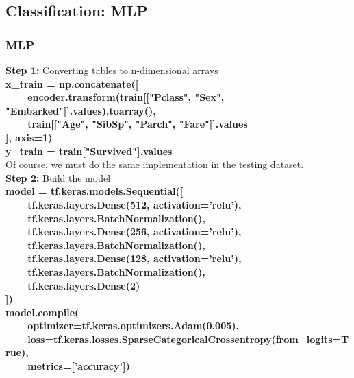 \documentclass{beamer}
\begin{document}
\subsection{Classification: MLP}
\begin{frame}
	\frametitle{MLP}
	\begin{flushleft}
		\textbf{Step 1:} Converting tables to n-dimensional arrays \\
		\textbf{\color{blue} \scriptsize
			x\_train = np.concatenate([ \\
		  ~~~~encoder.transform(train[["Pclass", "Sex", "Embarked"]].values).toarray(), \\
		  ~~~~train[["Age", "SibSp", "Parch", "Fare"]].values \\
			], axis=1) \\
			y\_train = train["Survived"].values \\
		}
		Of course, we must do the same implementation in the testing dataset. \\
		\textbf{Step 2:} Build the model \\
		\textbf{\color{blue} \scriptsize
			model = tf.keras.models.Sequential([               \\
		  ~~~~tf.keras.layers.Dense(512, activation='relu'), \\
		  ~~~~tf.keras.layers.BatchNormalization(),          \\
		  ~~~~tf.keras.layers.Dense(256, activation='relu'), \\
		  ~~~~tf.keras.layers.BatchNormalization(),          \\
		  ~~~~tf.keras.layers.Dense(128, activation='relu'), \\
		  ~~~~tf.keras.layers.BatchNormalization(),          \\
		  ~~~~tf.keras.layers.Dense(2)                       \\
			])                                                 \\
			model.compile(                                     \\
		  ~~~~optimizer=tf.keras.optimizers.Adam(0.005),     \\
		  ~~~~loss=tf.keras.losses.SparseCategoricalCrossentropy(from\_logits=True), \\
		  ~~~~metrics=['accuracy']) \\
		}
	\end{flushleft}
\end{frame}
\end{document}

